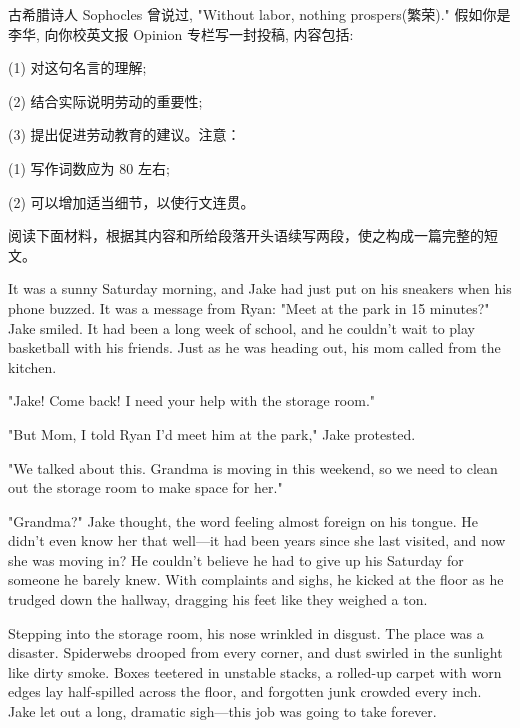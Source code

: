\documentclass{英语试卷}
\begin{document}
\par 古希腊诗人 Sophocles 曾说过, "Without labor, nothing prospers(繁荣)." 假如你是李华, 向你校英文报 Opinion 专栏写一封投稿, 内容包括:\par
\par (1) 对这句名言的理解;\par
\par (2) 结合实际说明劳动的重要性;\par
\par (3) 提出促进劳动教育的建议。注意：\par
\par (1) 写作词数应为 80 左右;\par
\par (2) 可以增加适当细节，以使行文连贯。\par
{}
\par 阅读下面材料，根据其内容和所给段落开头语续写两段，使之构成一篇完整的短文。\par
\par It was a sunny Saturday morning, and Jake had just put on his sneakers when his phone buzzed. It was a message from Ryan: "Meet at the park in 15 minutes?" Jake smiled. It had been a long week of school, and he couldn't wait to play basketball with his friends. Just as he was heading out, his mom called from the kitchen.\par
\par "Jake! Come back! I need your help with the storage room."\par
\par "But Mom, I told Ryan I'd meet him at the park," Jake protested.\par
\par "We talked about this. Grandma is moving in this weekend, so we need to clean out the storage room to make space for her."\par
\par "Grandma?" Jake thought, the word feeling almost foreign on his tongue. He didn't even know her that well—it had been years since she last visited, and now she was moving in? He couldn't believe he had to give up his Saturday for someone he barely knew. With complaints and sighs, he kicked at the floor as he trudged down the hallway, dragging his feet like they weighed a ton.\par
\par Stepping into the storage room, his nose wrinkled in disgust. The place was a disaster. Spiderwebs drooped from every corner, and dust swirled in the sunlight like dirty smoke. Boxes teetered in unstable stacks, a rolled-up carpet with worn edges lay half-spilled across the floor, and forgotten junk crowded every inch. Jake let out a long, dramatic sigh—this job was going to take forever.\par
\end{document}

